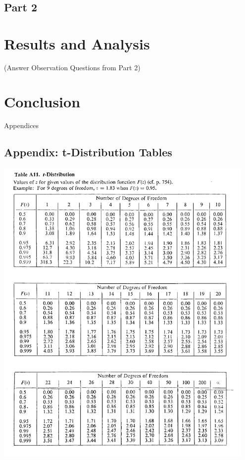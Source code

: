 \documentclass{article}
\begin{document}
\subsection{Part 2}


\section{Results and Analysis}
(Answer Observation Questions from Part 2)


\section{Conclusion}




\newpage
\thispagestyle{empty}  %
\begin{center}
	\vspace*{\fill}
	{\Huge Appendices}
	\vspace*{\fill}
\end{center}

\newpage
\begin{appendices}
\pagestyle{fancy}
\renewcommand{\thefigure}{A\arabic{figure}}
\setcounter{figure}{0}

\section*{Appendix: t-Distribution Tables}
\includegraphics[width=0.95\textwidth]{Lab 1/t_distribution_Table_lecture3.png}
\end{appendices}
\end{document}
